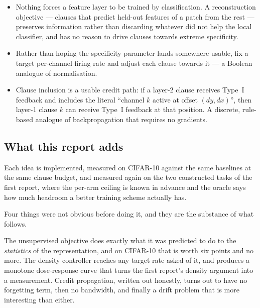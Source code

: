 \begin{itemize}[leftmargin=1.2em]
\item[\ideaA]  Nothing forces a feature layer to be
  trained by classification. A reconstruction objective --- clauses that predict held-out
  features of a patch from the rest --- preserves information rather than discarding whatever
  did not help the local classifier, and has no reason to drive clauses towards extreme
  specificity.
\item[\ideaB]  Rather than hoping the specificity
  parameter lands somewhere usable, fix a target per-channel firing rate and adjust each
  clause towards it --- a Boolean analogue of normalisation.
\item[\ideaC]  Clause inclusion is a usable credit
  path: if a layer-2 clause receives Type~I feedback and includes the literal ``channel $k$
  active at offset $(dy,dx)$'', then layer-1 clause $k$ can receive Type~I feedback at that
  position. A discrete, rule-based analogue of backpropagation that requires no gradients.
\end{itemize}

\subsection{What this report adds}

Each idea is implemented, measured on CIFAR-10 against the same baselines at the same clause
budget, and measured again on the two constructed tasks of the first report, where the
per-arm ceiling is known in advance and the oracle says how much headroom a better training
scheme actually has.

Four things were not obvious before doing it, and they are the substance of what follows.

The unsupervised objective does exactly what it was predicted to do to the \emph{statistics}
of the representation, and on CIFAR-10 that is worth six points and no more. The density
controller reaches any target rate asked of it, and produces a monotone dose-response curve
that turns the first report's density argument into a measurement. Credit propagation, written
out honestly, turns out to have no forgetting term, then no bandwidth, and finally a drift
problem that is more interesting than either.

